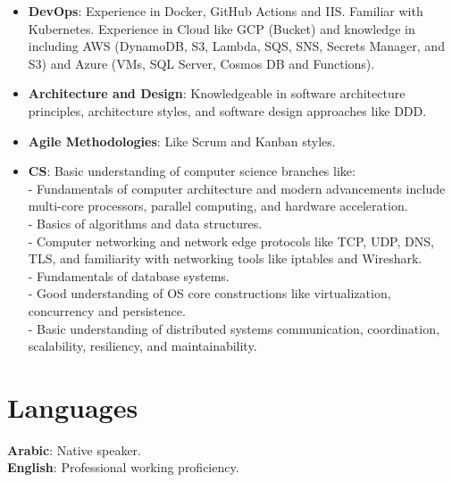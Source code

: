 \documentclass[letterpaper,11pt]{article}
\begin{document}
\begin{itemize}[leftmargin=0.15in, label={}]
    \vspace{-5pt}  
    \item{\textbf{DevOps}{: Experience in Docker, GitHub Actions and IIS. Familiar with Kubernetes. Experience in Cloud like GCP (Bucket) and knowledge in including AWS (DynamoDB, S3, Lambda, SQS, SNS, Secrets Manager, and S3) and Azure (VMs, SQL Server, Cosmos DB and Functions).}}
    \vspace{-5pt}      
    \item{\textbf{Architecture and Design}{: Knowledgeable in software architecture principles, architecture styles, and software design approaches like DDD.}}
    \vspace{-5pt}    
    \item{\textbf{Agile Methodologies}{: Like Scrum and Kanban styles.}}
    \vspace{-5pt}
    \item{\textbf{CS}{: Basic understanding of computer science branches like: \\
	- Fundamentals of computer architecture and modern advancements include multi-core processors, parallel computing, and hardware acceleration. \\
	- Basics of algorithms and data structures. \\
	- Computer networking and network edge protocols like TCP, UDP, DNS, TLS, and familiarity with networking tools like iptables and Wireshark. \\
	- Fundamentals of database systems. \\
	- Good understanding of OS core constructions like virtualization, concurrency and persistence. \\
 - Basic understanding of distributed systems communication, coordination, scalability, resiliency, and maintainability.}}
    \vspace{-5pt}        

    
 \end{itemize}
 \vspace{-16pt}

\section{Languages}
 \begin{itemize}[leftmargin=0.15in, label={}]
    {\item{
     \textbf{Arabic}{: Native speaker.} \\
     \textbf{English}{: Professional working proficiency.} \\
    }}
 \end{itemize}
 \vspace{-16pt}
  
\end{document}
